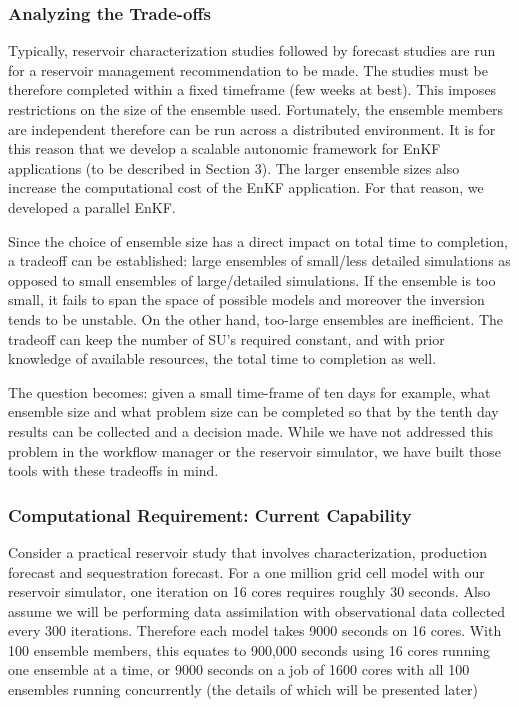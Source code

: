 \documentclass{rspublic}
\newcommand{\up}{\vspace*{-0.3em}}
\begin{document}
\subsubsection{Analyzing the Trade-offs}  

Typically, reservoir characterization studies followed by forecast
studies are run for a reservoir management recommendation to be
made. The studies must be therefore completed within a fixed timeframe
(few weeks at best). This imposes restrictions on the size of the
ensemble used. Fortunately, the ensemble members are independent
therefore can be run across a distributed environment. It is for this
reason that we develop a scalable autonomic framework for EnKF
applications (to be described in Section 3). The larger ensemble sizes
also increase the computational cost of the EnKF application. For that
reason, we developed a parallel EnKF.

Since the choice of ensemble size has a direct impact on total time to
completion, a tradeoff can be established: large ensembles of
small/less detailed simulations as opposed to small ensembles of
large/detailed simulations. If the ensemble is too small, it fails to
span the space of possible models and moreover the inversion tends to
be unstable. On the other hand, too-large ensembles are
inefficient. The tradeoff can keep the number of SU's required
constant, and with prior knowledge of available resources, the total
time to completion as well. 



The question becomes: given a small
time-frame of ten days for example, what ensemble size and what
problem size can be completed so that by the tenth day results can be
collected and a decision made. While we have not addressed this
problem in the workflow manager or the reservoir simulator, we have
built those tools with these tradeoffs in mind.

\up\up\up\up
\subsubsection{Computational Requirement: Current Capability}

Consider a practical reservoir study that involves characterization,
production forecast and sequestration forecast. For a one million grid
cell model with our reservoir simulator, one iteration on 16 cores
requires roughly 30 seconds. Also assume we will be performing data
assimilation with observational data collected every 300 iterations.
Therefore each model takes 9000 seconds on 16 cores. With 100 ensemble
members, this equates to 900,000 seconds using 16 cores running one
ensemble at a time, or 9000 seconds on a job of 1600 cores with all 100
ensembles running concurrently (the details of which will be presented
later)
\end{document}
